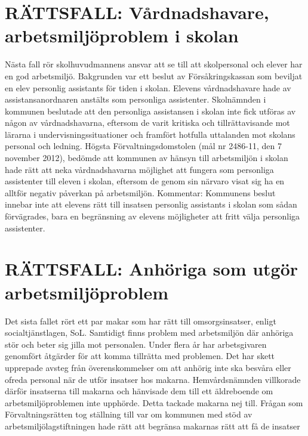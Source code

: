 \section*{RÄTTSFALL: Vårdnadshavare, arbetsmiljöproblem i skolan}
Nästa fall rör skolhuvudmannens ansvar att se till att skolpersonal och elever har en god arbetsmiljö. Bakgrunden var ett beslut av Försåkringskassan som beviljat en elev personlig assistants för tiden i skolan. Elevens vårdnadshavare hade av assistansanordnaren anstälts som personliga assistenter. Skolnämnden i kommunen beslutade att den personliga assistansen i skolan inte fick utföras av någon av vårdnadshavarna, eftersom de varit kritiska och tillrättavisande mot lärarna i undervisningssituationer och framfört hotfulla uttalanden mot skolans personal och ledning. Högsta Förvaltningsdomstolen (mål nr 2486-11, den 7 november 2012), bedömde att kommunen av hänsyn till arbetsmiljön i skolan hade rätt att neka vårdnadshavarna möjlighet att fungera som personliga assistenter till eleven i skolan, eftersom de genom sin närvaro visat sig ha en alltför negativ påverkan på arbetsmiljön.
Kommentar: Kommunens beslut innebar inte att elevens rätt till insatsen personlig assistants i skolan som sådan förvägrades, bara en begränsning av elevens möjligheter att fritt välja personliga assistenter.
\section*{RÄTTSFALL: Anhöriga som utgör arbetsmiljöproblem}
Det sista fallet rört ett par makar som har rätt till omsorgsinsatser, enligt socialtjänstlagen, SoL. Samtidigt finns problem med arbetsmiljön där anhöriga stör och beter sig jilla mot personalen. Under flera år har arbetsgivaren genomfört åtgärder för att komma tillrätta med problemen. Det har skett upprepade avsteg från överenskommelser om att anhörig inte ska besvåra eller ofreda personal när de utför insatser hos makarna. Hemvårdsnämnden villkorade därför insatserna till makarna och hänvisade dem till ett äldreboende om arbetsmiljöproblemen inte upphörde. Detta tackade makarna nej till.
Frågan som Förvaltningsrätten tog ställning till var om kommunen med stöd av arbetsmiljölagstiftningen hade rätt att begränsa makarnas rätt att få de insatser

